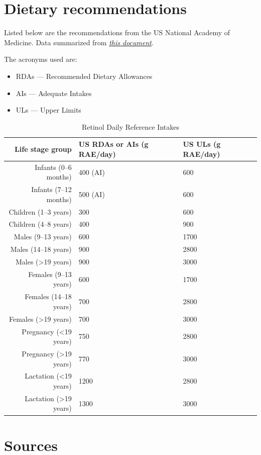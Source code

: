 \documentclass{book}
\begin{document}
\section{Dietary recommendations}
Listed below are the recommendations from the US National Academy of Medicine. Data summarized from \href{https://nap.nationalacademies.org/read/10026/chapter/6}{\textit{this document}}.

The acronyms used are:
\begin{itemize}
	\item RDAs --- Recommended Dietary Allowances
	\item AIs --- Adequate Intakes
	\item ULs --- Upper Limits
\end{itemize}

\begin{table}[h]
	\caption{Retinol Daily Reference Intakes}
	\centering \begin{tabular}{| r | l | l |}
		\hline
		\textbf{Life stage group} & \textbf{US RDAs or AIs (\textmu g RAE/day)} & \textbf{US ULs (\textmu g RAE/day)}\\ \hline
		Infants (0--6 months) & 400 (AI) & 600\\ \hline
		Infants (7--12 months) & 500 (AI) & 600\\ \hline
		Children (1--3 years) & 300 & 600\\ \hline
		Children (4--8 years) & 400 & 900\\ \hline
		Males (9--13 years) & 600 & 1700\\ \hline
		Males (14--18 years) & 900 & 2800\\ \hline
		Males (\textgreater19 years) & 900 & 3000\\ \hline
		Females (9--13 years) & 600 & 1700\\ \hline
		Females (14--18 years) & 700 & 2800\\ \hline
		Females (\textgreater19 years) & 700 & 3000\\ \hline
		Pregnancy (\textless19 years) & 750 & 2800\\ \hline
		Pregnancy (\textgreater19 years) & 770 & 3000\\ \hline
		Lactation (\textless19 years) & 1200 & 2800\\ \hline
		Lactation (\textgreater19 years) & 1300 & 3000\\ \hline
	\end{tabular}
\end{table}
\newpage

\section{Sources}
\end{document}
